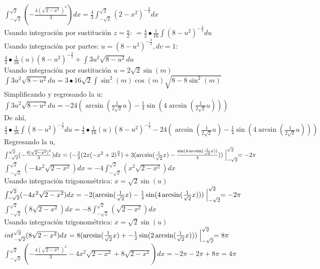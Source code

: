\documentclass{article}
\begin{document}
\begin{enumerate}
{		$\int_{-\sqrt{2}}^{\sqrt{2}}(-\frac{4(\sqrt{2-x^2})^3}{3})dx = \frac{4}{3}\int_{-\sqrt{2}}^{\sqrt{2}}(2-x^2)^{-\frac{3}{2}} dx$\\
		Usando integración por sustitución $z = \frac{u}{2}$:		
		$= \frac{4}{3}\bullet\frac{1}{16}\int(8-u^2)^{-\frac{3}{2}} du $\\
		Usando integración por partes: $u = (8-u^2)^{-\frac{3}{2}} , dv = 1$:
		$\frac{4}{3}\bullet\frac{1}{16}(u)(8-u^2)^{-\frac{3}{2}} + \int3u^2\sqrt{8-u^2}du$\\
		Usando integración por sustitución $u = 2\sqrt{2}\sin(m)$ $\int3u^2\sqrt{8-u^2}du = 3 \bullet 16\sqrt{2} \int \sin^2(m)\cos(m)\sqrt{8-8\sin^2(m)}$\\
		Simplificando y regresando la u:$\int3u^2\sqrt{8-u^2}du = -24(\arcsin(\frac{1}{2\sqrt{2}}u) - \frac{1}{4}\sin(4\arcsin(\frac{1}{2\sqrt{2}}u)))$\\
		De ahí, $\frac{4}{3}\bullet\frac{1}{16}\int(8-u^2)^{-\frac{3}{2}} du = \frac{4}{3}\bullet\frac{1}{16}(u)(8-u^2)^{-\frac{3}{2}} -24(\arcsin(\frac{1}{2\sqrt{2}}u) - \frac{1}{4}\sin(4\arcsin(\frac{1}{2\sqrt{2}}u)))$\\
		Regresando la u, $\int_{-\sqrt{2}}^{\sqrt{2}}(-\frac{4(\sqrt{2-x^2})^3}{3})dx = (-\frac{2}{3}(2x(-x^2 +2)^{\frac{3}{2}}) + 3(\arcsin(\frac{1}{\sqrt{2}}x) - \frac{\sin(4\arcsin(\frac{1}{\sqrt{2}}x))}{4}))\Bigm|_{-\sqrt{2}}^{\sqrt{2}} = -2\pi$\\
		
		$\int_{-\sqrt{2}}^{\sqrt{2}}(-4x^2\sqrt{2-x^2})dx = -4\int_{-\sqrt{2}}^{\sqrt{2}}(x^2\sqrt{2-x^2})dx$\\
		Usando integración trigonométrica: $x = \sqrt{2}\sin(u)$\\
		$\int_{-\sqrt{2}}^{\sqrt{2}}(-4x^2\sqrt{2-x^2})dx = -2(\arcsin(\frac{1}{\sqrt{2}}x) - \frac{1}{4}\sin(4\arcsin(\frac{1}{\sqrt{2}}x)))\Bigm|_{-\sqrt{2}}^{\sqrt{2}} = -2\pi$\\
		
		$\int_{-\sqrt{2}}^{\sqrt{2}}(8\sqrt{2-x^2})dx = -8\int_{-\sqrt{2}}^{\sqrt{2}}(\sqrt{2-x^2})dx$\\
		Usando integración trigonométrica: $x = \sqrt{2}\sin(u)$\\
		$int_{-\sqrt{2}}^{\sqrt{2}}(8\sqrt{2-x^2})dx = 8(\arcsin(\frac{1}{\sqrt{2}}x)+- \frac{1}{2}\sin(2\arcsin(\frac{1}{\sqrt{2}}x)))\Bigm|_{-\sqrt{2}}^{\sqrt{2}} = 8\pi$\\
		
		
		$\int_{-\sqrt{2}}^{\sqrt{2}}(-\frac{4(\sqrt{2-x^2})^3}{3} -4x^2\sqrt{2-x^2} + 8\sqrt{2-x^2})dx = -2\pi -2\pi + 8\pi = 4\pi$\\
		
}
\end{enumerate}
\end{document}
